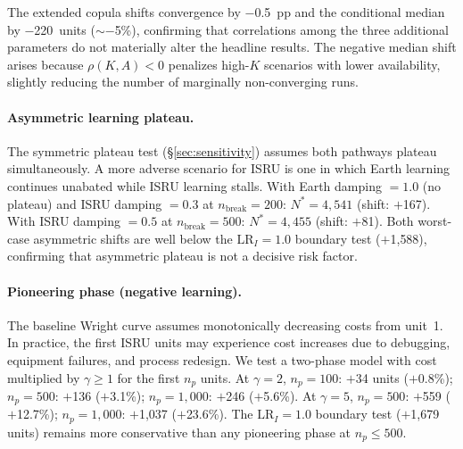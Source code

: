 \documentclass[5p,twocolumn]{elsarticle}
\begin{document}
\begin{table}[htbp]
\centering
\caption{Extended copula sensitivity: 3D (baseline) vs.\ 6D copula (10{,}000~runs, $r = 5\%$, $H = 40{,}000$, same seed).}
\label{tab:copula_6d}
\small
{}
\end{table}

The extended copula shifts convergence by $-$0.5~pp and the conditional median by $-$220~units (${\sim}-$5\%), confirming that correlations among the three additional parameters do not materially alter the headline results. The negative median shift arises because $\rho(K, A) < 0$ penalizes high-$K$ scenarios with lower availability, slightly reducing the number of marginally non-converging runs.

\paragraph{Asymmetric learning plateau.} The symmetric plateau test (\S\ref{sec:sensitivity}) assumes both pathways plateau simultaneously. A more adverse scenario for ISRU is one in which Earth learning continues unabated while ISRU learning stalls. With Earth damping $= 1.0$ (no plateau) and ISRU damping $= 0.3$ at $n_{\mathrm{break}} = 200$: $N^* = 4{,}541$ (shift: $+$167). With ISRU damping $= 0.5$ at $n_{\mathrm{break}} = 500$: $N^* = 4{,}455$ (shift: $+$81). Both worst-case asymmetric shifts are well below the $\mathrm{LR}_I = 1.0$ boundary test ($+$1{,}588), confirming that asymmetric plateau is not a decisive risk factor.

\paragraph{Pioneering phase (negative learning).} The baseline Wright curve assumes monotonically decreasing costs from unit~1. In practice, the first ISRU units may experience cost increases due to debugging, equipment failures, and process redesign. We test a two-phase model with cost multiplied by $\gamma \geq 1$ for the first $n_p$ units. At $\gamma = 2$, $n_p = 100$: $+$34 units ($+$0.8\%); $n_p = 500$: $+$136 ($+$3.1\%); $n_p = 1{,}000$: $+$246 ($+$5.6\%). At $\gamma = 5$, $n_p = 500$: $+$559 ($+$12.7\%); $n_p = 1{,}000$: $+$1{,}037 ($+$23.6\%). The $\mathrm{LR}_I = 1.0$ boundary test ($+$1{,}679 units) remains more conservative than any pioneering phase at $n_p \leq 500$.
\end{document}
